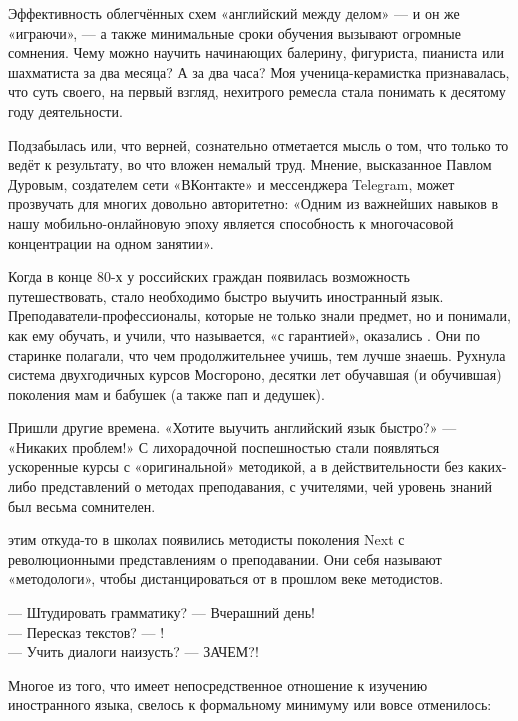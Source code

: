 Эффективность облегчённых схем «английский между делом» — и он же «играючи», — а также минимальные сроки обучения вызывают огромные сомнения. Чему можно научить начинающих балерину, фигуриста, пианиста или шахматиста за два месяца? А за два часа? Моя ученица-керамистка признавалась, что суть своего, на первый взгляд, нехитрого ремесла стала понимать к десятому году  деятельности.

Подзабылась или, что верней, сознательно отметается мысль о том, что только то ведёт к  результату, во что вложен немалый труд. Мнение, высказанное Павлом Дуровым, создателем сети «ВКонтакте» и мессенджера Telegram, может прозвучать для многих довольно авторитетно: «Одним из важнейших навыков в нашу мобильно-онлайновую эпоху является способность к многочасовой концентрации на одном занятии».

Когда в конце 80-х у российских граждан появилась возможность путешествовать, стало необходимо быстро выучить иностранный язык. Преподаватели-профессионалы, которые не только знали предмет, но и понимали, как ему обучать, и учили, что называется, «с гарантией», оказались . Они по старинке полагали, что чем продолжительнее учишь, тем лучше знаешь. Рухнула система двухгодичных курсов Мосгороно, десятки лет обучавшая (и обучившая) поколения мам и бабушек (а также пап и дедушек).

Пришли другие времена. «Хотите выучить английский язык быстро?» — «Никаких проблем!» С лихорадочной поспешностью стали появляться ускоренные курсы с «оригинальной» методикой, а в действительности без каких-либо представлений о методах преподавания, с учителями, чей уровень знаний был весьма сомнителен.

 этим откуда-то в школах появились методисты поколения Next с революционными представлениям о преподавании. Они себя называют «методологи», чтобы дистанцироваться от   в прошлом веке методистов.

— Штудировать грамматику? — Вчерашний день!\\
— Пересказ текстов? — !\\
— Учить диалоги наизусть? — ЗАЧЕМ?!

Многое из того, что имеет непосредственное отношение к изучению иностранного языка, свелось к формальному минимуму или вовсе отменилось:

